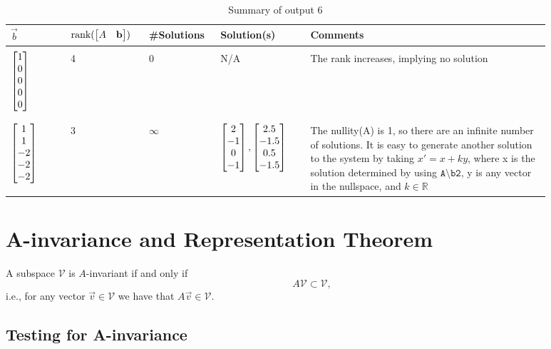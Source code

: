 \documentclass[10pt]{article}
\begin{document}
\begin{table}[ht]
    \centering
    \begin{tabular}{|p{0.1\linewidth}|p{0.13\linewidth}|p{0.1\linewidth}|p{0.15\linewidth}|p{0.4\linewidth}|}
        \hline
        $\vec{b}$ & $\text{rank}(\begin{bmatrix} A & \mathbf{b} \end{bmatrix})$ & \#Solutions & Solution(s) & Comments \\ \hline & & & & \\
        $\begin{bmatrix} 1\\0\\0\\0\\0 \end{bmatrix}$ & 4 & 0 & N/A & The rank increases, implying no solution\\ & & & & \\ \hline & & & & \\
        $\begin{bmatrix} 1\\1\\-2\\-2\\-2 \end{bmatrix}$ & 3 & $\infty$ & $\begin{bmatrix} 2\\-1\\0\\-1 \end{bmatrix}, \begin{bmatrix} 2.5\\-1.5\\0.5\\-1.5 \end{bmatrix}$ & \vspace{-1cm}The nullity(A) is 1, so there are an infinite number of solutions. It is easy to generate another solution to the system by taking $x' = x + ky$, where x is the solution determined by using $\texttt{A\textbackslash b2}$, y is any vector in the nullspace, and $k \in \mathbb{R}$ \vspace{0.4cm} \\ \hline
    \end{tabular}
    \caption{Summary of output 6}
    \label{tab:solns}
\end{table}

\section{A-invariance and Representation Theorem}
A subspace $\mathcal{V}$ is $A$-invariant if and only if
\[
    A\mathcal{V} \subset \mathcal{V},
\]
i.e., for any vector $\vec{v} \in \mathcal{V}$ we have that $A\vec{v} \in \mathcal{V}$.

\subsection{Testing for A-invariance}
\end{document}
